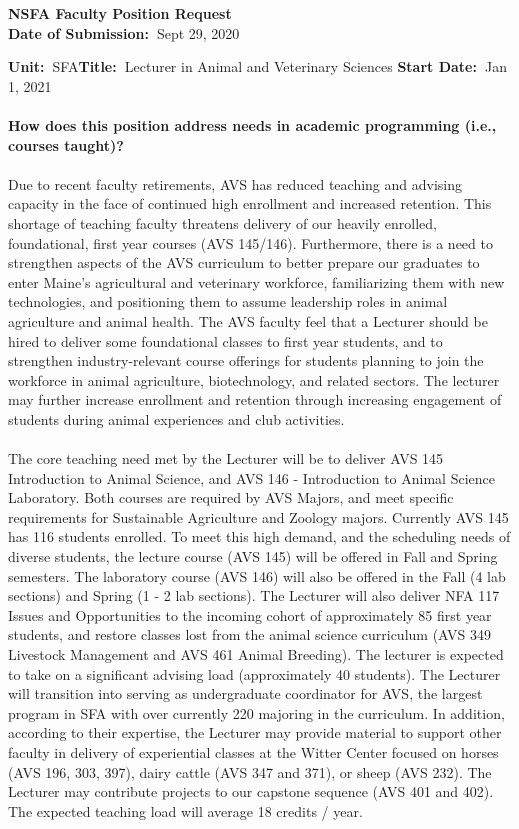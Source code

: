 \documentclass[11pt]{article}
\begin{document}
\sloppy \rmfamily
\begin{center}\textbf{NSFA Faculty Position Request\\Date of Submission:~}Sept 29, 2020\end{center}

\noindent\textbf{Unit:~}SFA\hfill\textbf{Title:~}Lecturer in Animal and Veterinary Sciences \hfill \textbf{Start Date:~}Jan 1, 2021\\~\\
\textbf{How does this position address needs in academic programming (i.e., courses taught)?}\\~\\
\small\sffamily Due to recent faculty retirements, AVS has reduced teaching and advising capacity in the face of continued high enrollment and increased retention. This shortage of teaching faculty threatens delivery of our heavily enrolled, foundational, first year courses (AVS 145/146). Furthermore, there is a need to strengthen aspects of the AVS curriculum to better prepare our graduates to enter Maine's agricultural and veterinary workforce, familiarizing them with new technologies, and positioning them to assume leadership roles in animal agriculture and animal health. The AVS faculty feel that a Lecturer should be hired to deliver some foundational classes to first year students, and to strengthen industry-relevant course offerings for students planning to join the workforce in animal agriculture, biotechnology, and related sectors. The lecturer may further increase enrollment and retention through increasing engagement of students during animal experiences and club activities.
\\~\\
The core teaching need met by the Lecturer will be to deliver AVS 145 Introduction to Animal Science, and AVS 146 - Introduction to Animal Science Laboratory. Both courses are required by AVS Majors, and meet specific requirements for Sustainable Agriculture and Zoology majors. Currently AVS 145 has 116 students enrolled. To meet this high demand, and the scheduling needs of diverse students, the lecture course (AVS 145) will be offered in Fall and Spring semesters. The laboratory course (AVS 146) will also be offered in the Fall (4 lab sections) and Spring (1 - 2 lab sections). The Lecturer will also deliver NFA 117 Issues and Opportunities to the incoming cohort of approximately 85 first year students, and restore classes lost from the animal science curriculum (AVS 349 Livestock Management and AVS 461 Animal Breeding). The lecturer is expected to take on a significant advising load (approximately 40 students). The Lecturer will transition into serving as undergraduate coordinator for AVS, the largest program in SFA with over currently 220 majoring in the curriculum. In addition, according to their expertise, the Lecturer may provide material to support other faculty in delivery of experiential classes at the Witter Center focused on horses (AVS 196, 303, 397), dairy cattle (AVS 347 and 371), or sheep (AVS 232). The Lecturer may contribute projects to our capstone sequence (AVS 401 and 402). The expected teaching load will average 18 credits / year.
\end{document}
